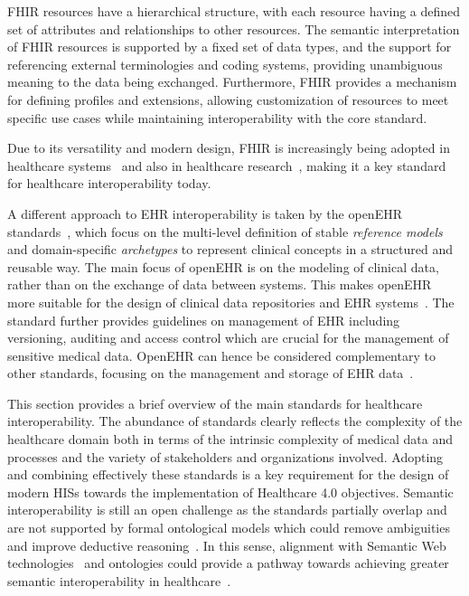 \ac{FHIR} resources have a hierarchical structure, with each resource having a defined set of attributes and relationships to other resources.
%
The semantic interpretation of \ac{FHIR} resources is supported by a fixed set of data types, and the support for referencing external terminologies and coding systems, providing unambiguous meaning to the data being exchanged.
%
Furthermore, \ac{FHIR} provides a mechanism for defining profiles and extensions, allowing customization of resources to meet specific use cases while maintaining interoperability with the core standard. 

Due to its versatility and modern design, \ac{FHIR} is increasingly being adopted in healthcare systems~\cite{Ayaz_Pasha_Alzahrani_Budiarto_Stiawan_2021} and also in healthcare research~\cite{Vorisek_Lehne_Klopfenstein_Mayer_Bartschke_Haese_Thun_2022}, making it a key standard for healthcare interoperability today.

A different approach to \ac{EHR} interoperability is taken by the openEHR standards~\cite{openEHR_architecture_overview}, which focus on the multi-level definition of stable \emph{reference models} and domain-specific \emph{archetypes} to represent clinical concepts in a structured and reusable way.
%
The main focus of openEHR is on the modeling of clinical data, rather than on the exchange of data between systems.
%
This makes openEHR more suitable for the design of clinical data repositories and \ac{EHR} systems~\cite{Delussu_Frexia_Mascia_Sulis_Meloni_Del_Rio_Lianas_2024}.
%
The standard further provides guidelines on management of \ac{EHR} including versioning, auditing and access control which are crucial for the management of sensitive medical data. 
%
OpenEHR can hence be considered complementary to other standards, focusing on the management and storage of \ac{EHR} data~\cite{Bosca_Moner_Maldonado_Robles_2015,Pedrera-Jiménez_García-Barrio_Frid_Moner_Boscá-Tomás_Lozano-Rubí_Kalra_Beale_Muñoz-Carrero_Serrano-Balazote_2023}. 

This section provides a brief overview of the main standards for healthcare interoperability. 
%
The abundance of standards clearly reflects the complexity of the healthcare domain both in terms of the intrinsic complexity of medical data and processes and the variety of stakeholders and organizations involved.
%
Adopting and combining effectively these standards is a key requirement for the design of modern \acp{HIS} towards the implementation of Healthcare 4.0 objectives.
%
Semantic interoperability is still an open challenge as the standards partially overlap and are not supported by formal ontological models which could remove ambiguities and improve deductive reasoning~\cite{de_Mello_Rigo_da_Costa_da_Rosa_Righi_Donida_Bez_Schunke_2022}.
%
In this sense, alignment with Semantic Web technologies~\cite{berners2023semantic} and ontologies could provide a pathway towards achieving greater semantic interoperability in healthcare~\cite{Schulz_Martínez-Costa_2013}.

